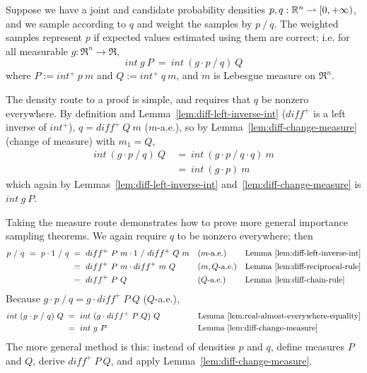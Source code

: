 Suppose we have a joint and candidate probability densities $p,q : \mathbb{R}^n \rightharpoonup [0,+\infty)$, and we sample according to $q$ and weight the samples by $p~{/}~q$.
The weighted samples represent $p$ if expected values estimated using them are correct; i.e. for all measurable $g : \Re^n \to \Re$,
\begin{equation}
	int~g~P\ =\ int~(g \cdot p~{/}~q)~Q
\end{equation}
where $P := int^+~p~m$ and $Q := int^+~q~m$, and $m$ is Lebesgue measure on $\Re^n$.

The density route to a proof is simple, and requires that $q$ be nonzero everywhere.
By definition and Lemma~\ref{lem:diff-left-inverse-int} ($diff^+$ is a left inverse of $int^+$), $q = diff^+~Q~m$ ($m$-a.e.), so by Lemma~\ref{lem:diff-change-measure} (change of measure) with $m_1 = Q$,
\begin{equation}
\begin{aligned}
	int~(g \cdot p~{/}~q)~Q
	&\ =\ int~(g \cdot p~{/}~q \cdot q)~m
\\
	&\ =\ int~(g \cdot p)~m
\end{aligned}
\end{equation}
which again by Lemmas~\ref{lem:diff-left-inverse-int} and~\ref{lem:diff-change-measure} is $int~g~P$.

Taking the measure route demonstrates how to prove more general importance sampling theorems.
We again require $q$ to be nonzero everywhere; then
\begin{equation}
\begin{aligned}
	p~{/}~q\ =\ p \cdot 1~{/}~q
	&\ =\ diff^+~P~m \cdot 1~{/}~diff^+~Q~m 
	&&\text{($m$-a.e.)} && \text{Lemma~\ref{lem:diff-left-inverse-int}}
\\
	&\ =\ diff^+~P~m \cdot diff^+~m~Q
	&&\text{($m,Q$-a.e.)} && \text{Lemma~\ref{lem:diff-reciprocal-rule}}
\\
	&\ =\ diff^+~P~Q
	&&\text{($Q$-a.e.)} && \text{Lemma~\ref{lem:diff-chain-rule}}
\end{aligned}
\end{equation}
Because $g \cdot p~{/}~q = g \cdot diff^+~P~Q$ ($Q$-a.e.),
\begin{equation}
\begin{aligned}
	int~(g \cdot p~{/}~q)~Q
	&\ =\ int~(g \cdot diff^+~P~Q)~Q
	&&\hspace{0.5in} \text{Lemma~\ref{lem:real-almost-everywhere-equality}}
\\
	&\ =\ int~g~P
	&&\hspace{0.5in} \text{Lemma~\ref{lem:diff-change-measure}}
\end{aligned}
\end{equation}
The more general method is this: instead of densities $p$ and $q$, define measures $P$ and $Q$, derive $diff^+~P~Q$, and apply Lemma~\ref{lem:diff-change-measure}.

